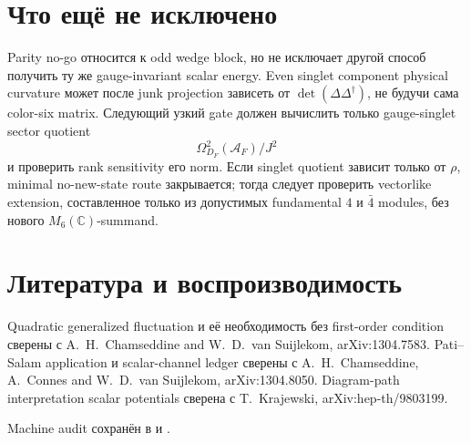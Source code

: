 \section{Что ещё не исключено}

Parity no-go относится к odd wedge block, но не исключает другой способ
получить ту же gauge-invariant scalar energy. Even singlet component physical
curvature может после junk projection зависеть от
\(\det(\Delta\Delta^\dagger)\), не будучи сама color-six matrix.
Следующий узкий gate должен вычислить только gauge-singlet sector quotient
\begin{equation}
 \Omega^2_{D_F}(\mathcal A_F)\big/ J^2
\end{equation}
и проверить rank sensitivity его norm. Если singlet quotient зависит только
от \(\rho\), minimal no-new-state route закрывается; тогда следует проверить
vectorlike extension, составленное только из допустимых fundamental
\(4\) и \(\bar4\) modules, без нового \(M_6(\mathbb C)\)-summand.

\section{Литература и воспроизводимость}

Quadratic generalized fluctuation и её необходимость без first-order
condition сверены с A.~H.~Chamseddine and W.~D.~van Suijlekom,
arXiv:1304.7583. Pati--Salam application и scalar-channel ledger сверены с
A.~H.~Chamseddine, A.~Connes and W.~D.~van Suijlekom,
arXiv:1304.8050. Diagram-path interpretation scalar potentials сверена с
T.~Krajewski, arXiv:hep-th/9803199.

Machine audit сохранён в
 и
.